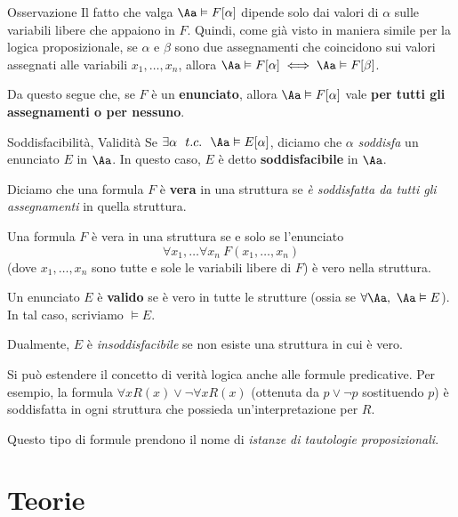 \documentclass[a4paper,11pt]{report}
\begin{document}
\begin{gframe}{Osservazione}
    Il fatto che valga \( \Aa \vDash F[\alpha] \) dipende solo dai valori di \( \alpha \) sulle variabili libere che appaiono in \( F \). Quindi, come già visto in maniera simile per la logica proposizionale, se \( \alpha \) e \( \beta \) sono due assegnamenti che coincidono sui valori assegnati alle variabili \( x_1, \dots, x_n \), allora \( \Aa \vDash F[\alpha] \iff \Aa \vDash F[\beta]\).

    Da questo segue che, se \( F \) è un \textbf{enunciato}, allora \( \Aa \vDash F[\alpha]\) vale \textbf{per tutti gli assegnamenti o per nessuno}.
\end{gframe}

\begin{defframe}{Soddisfacibilità, Validità}{}
    Se \( \exists \alpha \ \ t.c. \ \ \Aa \vDash E[\alpha] \), diciamo che \( \alpha \) \textit{soddisfa} un enunciato \( E \) in \( \Aa \). In questo caso, \( E \) è detto \textbf{soddisfacibile} in \( \Aa \).

    Diciamo che una formula \( F \) è \textbf{vera} in una struttura se \textit{è soddisfatta da tutti gli assegnamenti} in quella struttura.

    \begin{gframe}{}
        Una formula \( F \) è vera in una struttura se e solo se l'enunciato
        \[ \forall x_1, \dots \forall x_n \ F(x_1, \dots, x_n) \] 
        (dove \( x_1, \dots, x_n \) sono tutte e sole le variabili libere di \( F \)) è vero nella struttura.
    \end{gframe}

    Un enunciato \( E \) è \textbf{valido} se è vero in tutte le strutture (ossia se \( \forall \Aa, \ \Aa \vDash E \)). In tal caso, scriviamo \( \vDash E \).

    Dualmente, \( E \) è \textit{insoddisfacibile} se non esiste una struttura in cui è vero.
\end{defframe}

Si può estendere il concetto di verità logica anche alle formule predicative. Per esempio, la formula \( \forall x R(x) \lor \neg\forall x R(x)\) (ottenuta da \( p \lor \neg p \) sostituendo \( p \)) è soddisfatta in ogni struttura che possieda un'interpretazione per \( R \).

Questo tipo di formule prendono il nome di \textit{istanze di tautologie proposizionali}.

\section{Teorie}
\end{document}
